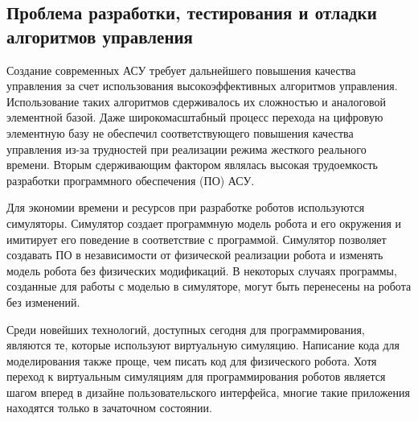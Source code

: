 \subsection{Проблема разработки, тестирования и отладки алгоритмов управления}
\label{sec:domain:4}

Создание современных АСУ требует дальнейшего повышения качества управления за счет использования высокоэффективных алгоритмов управления. Использование таких алгоритмов сдерживалось их сложностью и аналоговой элементной базой. Даже широкомасштабный процесс перехода на цифровую элементную базу не обеспечил соответствующего повышения качества управления из-за трудностей при реализации режима жесткого реального времени. Вторым сдерживающим фактором являлась высокая трудоемкость разработки программного обеспечения (ПО) АСУ.

Для экономии времени и ресурсов при разработке роботов используются симуляторы. Симулятор создает программную модель робота и его окружения и имитирует его поведение в соответствие с программой. Симулятор позволяет создавать ПО в независимости от физической реализации робота и изменять модель робота без физических модификаций. В некоторых случаях программы, созданные для работы с моделью в симуляторе, могут быть перенесены на робота без изменений.

Среди новейших технологий, доступных сегодня для программирования, являются те, которые используют виртуальную симуляцию. Написание кода для моделирования также проще, чем писать код для физического робота. Хотя переход к виртуальным симуляциям для программирования роботов является шагом вперед в дизайне пользовательского интерфейса, многие такие приложения находятся только в зачаточном состоянии.




